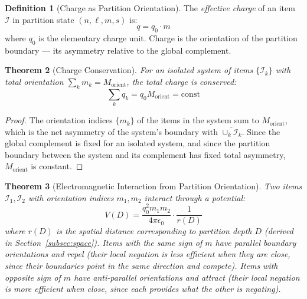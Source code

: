 \documentclass[11pt,twocolumn,a4paper]{article}
\theoremstyle{plain}
\newtheorem{theorem}{Theorem}[section]
\theoremstyle{definition}
\newtheorem{definition}[theorem]{Definition}
\theoremstyle{remark}
\begin{document}
\begin{definition}[Charge as Partition Orientation]
\label{def:charge}
The \emph{effective charge} of an item $\mathcal{I}$ in partition state
$(n,\ell,m,s)$ is:
\begin{equation}
    q = q_0 \cdot m
    \label{eq:charge_def}
\end{equation}
where $q_0$ is the elementary charge unit. Charge is the orientation of the
partition boundary --- its asymmetry relative to the global complement.
\end{definition}

\begin{theorem}[Charge Conservation]
\label{thm:charge_conserve}
For an isolated system of items $\{\mathcal{I}_k\}$ with total orientation
$\sum_k m_k = M_{\mathrm{orient}}$, the total charge is conserved:
\begin{equation}
    \sum_k q_k = q_0 M_{\mathrm{orient}} = \mathrm{const}
    \label{eq:charge_conserve}
\end{equation}
\end{theorem}

\begin{proof}
The orientation indices $\{m_k\}$ of the items in the system sum to
$M_{\mathrm{orient}}$, which is the net asymmetry of the system's boundary
with $\overline{\cup_k \mathcal{I}_k}$. Since the global complement is fixed
for an isolated system, and since the partition boundary between the system and
its complement has fixed total asymmetry, $M_{\mathrm{orient}}$ is constant.
\end{proof}

\begin{theorem}[Electromagnetic Interaction from Partition Orientation]
\label{thm:em_from_partition}
Two items $\mathcal{I}_1, \mathcal{I}_2$ with orientation indices $m_1, m_2$
interact through a potential:
\begin{equation}
    V(D) = \frac{q_0^2 m_1 m_2}{4\pi\epsilon_0} \cdot \frac{1}{r(D)}
    \label{eq:em_potential}
\end{equation}
where $r(D)$ is the spatial distance corresponding to partition depth $D$
(derived in Section~\ref{subsec:space}). Items with the same sign of $m$ have
parallel boundary orientations and repel (their local negation is less efficient
when they are close, since their boundaries point in the same direction and
compete). Items with opposite sign of $m$ have anti-parallel orientations and
attract (their local negation is more efficient when close, since each provides
what the other is negating).
\end{theorem}
\end{document}
